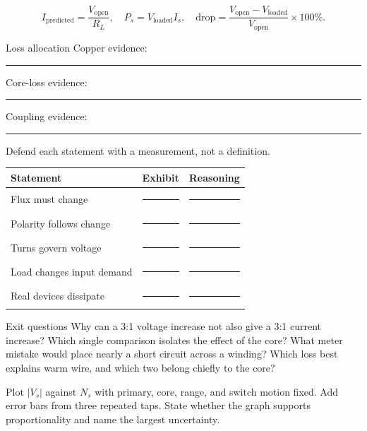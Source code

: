 \[
I_{\mathrm{predicted}}=\frac{V_{\mathrm{open}}}{R_L},
\quad P_s=V_{\mathrm{loaded}}I_s,
\quad
\text{drop}=\frac{V_{\mathrm{open}}-V_{\mathrm{loaded}}}
{V_{\mathrm{open}}}\times100\%.
\]

\begin{teloscard}{Loss allocation}
Copper evidence:\quad\rule{.73\linewidth}{.3pt}\par
\smallskip
Core-loss evidence:\quad\rule{.70\linewidth}{.3pt}\par
\smallskip
Coupling evidence:\quad\rule{.71\linewidth}{.3pt}
\end{teloscard}

\newpage
{}
\footnotesize
{}
Defend each statement with a measurement, not a definition.
\begin{center}\small
\begin{tabularx}{\linewidth}{@{}p{.20\linewidth}p{.31\linewidth}L@{}}
\toprule
Statement & Exhibit & Reasoning\\
\midrule
Flux must change & \rule{.95\linewidth}{.3pt} & \rule{.95\linewidth}{.3pt}\\[1em]
Polarity follows change & \rule{.95\linewidth}{.3pt} & \rule{.95\linewidth}{.3pt}\\[1em]
Turns govern voltage & \rule{.95\linewidth}{.3pt} & \rule{.95\linewidth}{.3pt}\\[1em]
Load changes input demand & \rule{.95\linewidth}{.3pt} & \rule{.95\linewidth}{.3pt}\\[1em]
Real devices dissipate & \rule{.95\linewidth}{.3pt} & \rule{.95\linewidth}{.3pt}\\
\bottomrule
\end{tabularx}
\end{center}

\begin{telospanel}{Exit questions}
Why can a 3:1 voltage increase not also give a 3:1 current increase? Which
single comparison isolates the effect of the core? What meter mistake would
place nearly a short circuit across a winding? Which loss best explains warm
wire, and which two belong chiefly to the core?
\end{telospanel}

Plot \(\lvert V_s\rvert\) against \(N_s\) with primary, core, range, and switch
motion fixed. Add error bars from three repeated taps. State whether the graph
supports proportionality and name the largest uncertainty.

